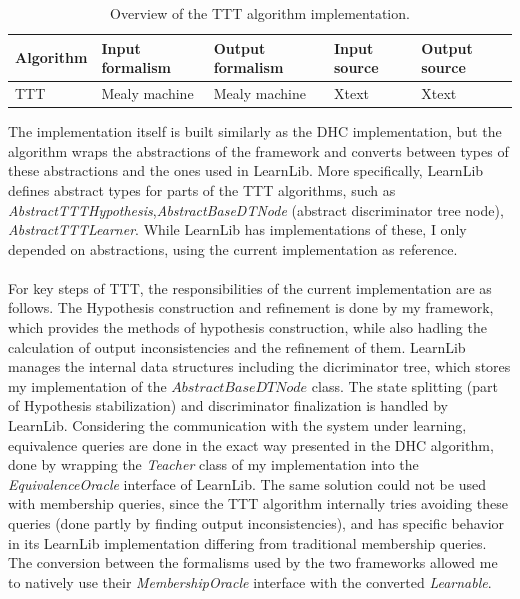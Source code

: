 \renewcommand{\tabularxcolumn}[1]{m{#1}}
\begin{table}[H]
	
	\begin{tabularx}{\columnwidth}{YYYYY}
		\hline
		\textbf{Algorithm} & \textbf{Input formalism} & \textbf{Output formalism} & \textbf{Input source} & \textbf{Output source}\\ \hline
		TTT & Mealy machine & Mealy machine & Xtext & Xtext \\	\hline
	\end{tabularx}
	\caption{Overview of the TTT algorithm implementation.}
	\label{tab:TTTformalisms}
\end{table}

The implementation itself is built similarly as the DHC implementation, but the algorithm wraps the abstractions of the framework and converts between types of these abstractions and the ones used in LearnLib. More specifically, LearnLib defines abstract types for parts of the TTT algorithms, such as \emph{AbstractTTTHypothesis},\emph{AbstractBaseDTNode} (abstract discriminator tree node), \emph{AbstractTTTLearner}. While LearnLib has implementations of these, I only depended on abstractions, using the current implementation as reference.
\\\\
For key steps of TTT, the responsibilities of the current implementation are as follows. The Hypothesis construction and refinement is done by my framework, which provides the methods of hypothesis construction, while also hadling the calculation of output inconsistencies and the refinement of them. LearnLib manages the internal data structures including the dicriminator tree, which stores my implementation of the $AbstractBaseDTNode$ class. The state splitting (part of Hypothesis stabilization) and discriminator finalization is handled by LearnLib. Considering the communication with the system under learning, equivalence queries are done in the exact way presented in the DHC algorithm, done by wrapping the \emph{Teacher} class of my implementation into the \emph{EquivalenceOracle} interface of LearnLib. The same solution could not be used with membership queries, since the TTT algorithm internally tries avoiding these queries (done partly by finding output inconsistencies), and has specific behavior in its LearnLib implementation differing from traditional membership queries. The conversion between the formalisms used by the two frameworks allowed me to natively use their \emph{MembershipOracle} interface with the converted \emph{Learnable}.
